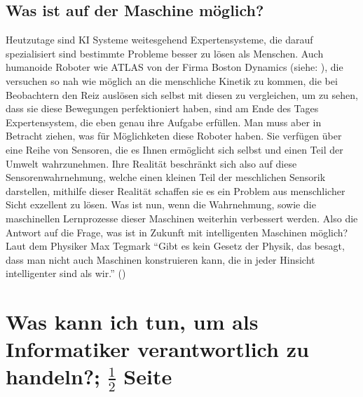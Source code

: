 \documentclass[a4paper, 11pt]{scrartcl}
\begin{document}
\subsection{Was ist auf der Maschine möglich?}
Heutzutage sind KI Systeme weitesgehend Expertensysteme, die darauf spezialisiert sind bestimmte Probleme besser zu lösen als Menschen. Auch humanoide Roboter wie ATLAS von der Firma Boston Dynamics (siehe: \cite{Atlas2019}), die versuchen so nah wie möglich an die menschliche Kinetik zu kommen, die bei Beobachtern den Reiz auslösen sich selbst mit diesen zu vergleichen, um zu sehen, dass sie diese Bewegungen perfektioniert haben, sind am Ende des Tages Expertensystem, die eben genau ihre Aufgabe erfüllen. Man muss aber in Betracht ziehen, was für Möglichketen diese Roboter haben. Sie verfügen über eine Reihe von Sensoren, die es Ihnen ermöglicht sich selbst und einen Teil der Umwelt wahrzunehmen. Ihre Realität beschränkt sich also auf diese Sensorenwahrnehmung, welche einen kleinen Teil der meschlichen Sensorik darstellen, mithilfe dieser Realität schaffen sie es ein Problem aus menschlicher Sicht exzellent zu lösen. Was ist nun, wenn die Wahrnehmung, sowie die maschinellen Lernprozesse dieser Maschinen weiterhin verbessert werden. Also die Antwort auf die Frage, was ist in Zukunft mit intelligenten Maschinen möglich? Laut dem Physiker Max Tegmark ``Gibt es kein Gesetz der Physik, das besagt, dass man nicht auch Maschinen konstruieren kann, die in jeder Hinsicht intelligenter sind als wir.'' (\cite{Tegmark2017})


\newpage



\section{Was kann ich tun, um als Informatiker verantwortlich zu handeln?; $\frac{1}{2}$ Seite}

\newpage

\printbibliography














% 

% 
\end{document}
